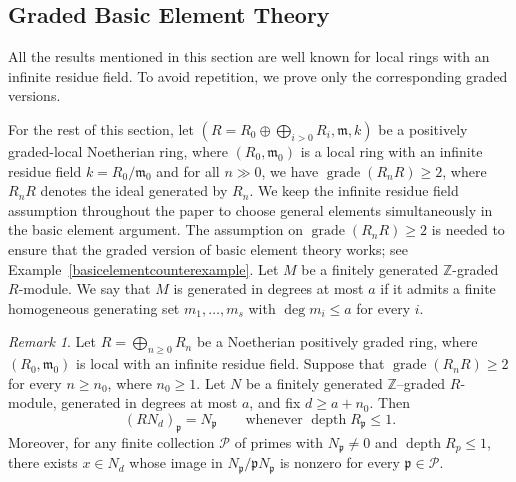 \documentclass[11pt,letterpaper]{amsart}
\DeclareMathOperator{\gr}{grade}
\DeclareMathOperator{\depth}{depth}
\theoremstyle{plain}
\theoremstyle{definition}
\theoremstyle{remark}
\newtheorem{remark}[thm]{Remark}
\begin{document}
\subsection{Graded Basic Element Theory} All the results mentioned in this section are well known for local rings with an infinite residue field. To avoid repetition, we prove only the corresponding graded versions.

For the rest of this section, let \((R=R_0\oplus\bigoplus_{i>0}R_i,\mathfrak m,k)\) be a positively graded-local Noetherian ring, where \((R_0,\mathfrak m_0)\) is a local ring with an infinite residue field \(k=R_0/\mathfrak m_0\) and for all $n\gg 0$, we have $\gr (R_nR)\ge 2$, where $R_nR$ denotes the ideal generated by $R_n$. We keep the infinite residue field assumption throughout the paper to choose general elements simultaneously in the basic element argument. The assumption on $\gr(R_nR)\ge 2$ is needed to ensure that the graded version of basic element theory works; see Example~\ref{basicelementcounterexample}. Let \(M\) be a finitely generated $\mathbb Z$-graded \(R\)-module. We say that $M$ is generated in degrees at most $a$ if it admits
a finite homogeneous generating set $m_1,\ldots,m_s$ with
$\deg m_i\le a$ for every $i$. 

\begin{remark}
\label{rem:homogeneous-choice}
Let $R=\bigoplus_{n\ge0}R_n$ be a Noetherian positively graded ring,
where $(R_0,\mathfrak m_0)$ is local with an infinite residue field.
Suppose that $\operatorname{grade}(R_nR)\ge2$ for every $n\ge n_0$,
where $n_0\ge1$.
Let $N$ be a finitely generated $\mathbb{Z}$--graded $R$-module, generated in
degrees at most $a$, and fix $d\ge a+n_0$. Then
\[
(RN_d)_{\mathfrak p}=N_{\mathfrak p}
\qquad\text{whenever }\operatorname{depth}R_{\mathfrak p}\le1.
\]
Moreover, for any finite collection $\mathcal P$ of primes
with $N_{\mathfrak p}\ne0$ and $\depth R_p\le 1$, there exists $x\in N_d$ whose image in
$N_{\mathfrak p}/\mathfrak pN_{\mathfrak p}$ is nonzero for every
$\mathfrak p\in\mathcal P$. 

\end{remark}
\end{document}
